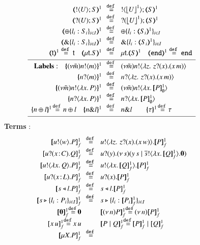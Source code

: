 \begin{figure}[t]
\[\begin{array}{rcll}
	\tmap{\btout{U} S}{1} &\!\!\defeq\!\!& \btout{{\vtmap{U}{1}}} \tmap{S}{1}\\
	\tmap{\btinp{U} S}{1} &\!\!\defeq\!\!& \btinp{{\vtmap{U}{1}}} \tmap{S}{1}\\
	\tmap{\btsel{l_i: S_i}_{i \in I}}{1} &\!\!\defeq\!\!& \btsel{l_i: \tmap{S_i}{1}}_{i \in I}\\
			\tmap{\btbra{l_i: S_i}_{i \in I}}{1} &\!\!\defeq\!\!& \btbra{l_i: \tmap{S_i}{1}}_{i \in I}\\
	\tmap{\vart{t}}{1} \defeq \vart{t} \quad 
			\tmap{\trec{t}{S}}{1}  &\!\!\defeq\!\!&
	\trec{t}{\tmap{S}{1}}\quad 
	\tmap{\tinact}{1}  \defeq  \tinact\\[1mm]
	\hline
	\noindent{\bf Labels:} \quad 
		\mapa{(\nu \tilde{m})\bactout{n}{m}}^{1} &\!\!\defeq\!\!&   
(\nu \tilde{m})\bactout{n}{\abs{z}{\,\binp{z}{x} (\appl{x}{m})} } \\
		\mapa{\bactinp{n}{m}}^{1} &\!\!\defeq\!\!&   \bactinp{n}{\abs{z}{\,\binp{z}{x} (\appl{x}{m})} } \\
	\mapa{(\nu \tilde{m})\bactout{n}{\abs{{x}}{P}}}^{1} &\!\!\defeq\!\!& 
(\nu \tilde{m})\bactout{n}{\abs{{x}}{\pmapp{P}{1}{\es}}}\\
			\mapa{\bactinp{n}{\abs{{x}}{P}}}^{1} &\!\!\defeq\!\!& \bactinp{n}{\abs{{x}}{\pmapp{P}{1}{\es}}}\\
			\mapa{\bactsel{n}{l} }^{1} \!\defeq\! \bactsel{n}{l} 
	\quad 
			\mapa{\bactbra{n}{l} }^{1} &\!\!\defeq\!\!& \bactbra{n}{l} 
	\quad \quad 
			\mapa{\tau}^{1} \!\defeq\! \tau
\\[1mm]
\hline
\end{array}
\]
{\bf Terms} : 
\[
\begin{array}{rcll}
  \pmapp{\bout{u}{w} P}{1}{f}	&\!\!\defeq\!\!&	\bout{u}{ \abs{z}{\,\binp{z}{x} (\appl{x}{w})} } \pmapp{P}{1}{f} \\
  \pmapp{\binp{u}{\AT{x}{C}} Q}{1}{f}	&\!\!\defeq\!\!&	\binp{u}{y} \newsp{s}{\appl{y}{s} \Par \bout{\dual{s}}{\abs{x}{\pmapp{Q}{1}{f}}} \inact} \\
		\pmapp{\bout{u}{\abs{{x}}{Q}} P}{1}{f}  
&\!\!\defeq\!\!& \bout{u}{\abs{{x}}{\pmapp{Q}{1}{f}}} \pmapp{P}{1}{f} \\
		\pmapp{\binp{u}{\AT{x}{L}} P}{1}{f} &\!\!\defeq\!\!& \binp{u}{x} \pmapp{P}{1}{f}\\
		\pmapp{\bsel{s}{l} P}{1}{f} &\!\!\defeq\!\!& \bsel{s}{l} \pmapp{P}{1}{f}\\
		\pmapp{\bbra{s}{l_i: P_i}_{i \in I}}{1}{f} &\!\!\defeq\!\!& \bbra{s}{l_i: \pmapp{P_i}{1}{f}}_{i \in I}\\
		\pmapp{\inact}{1}{f} \!\!\defeq\!\!\inact
& & 
		\pmapp{\news{n} P}{1}{f} \!\!\defeq\!\! \news{n} \pmapp{P}{1}{f}\\
\pmapp{{x}\, {u}}{1}{f}
 \!\!\defeq\!\!
{x}\, {u}
& & 		\pmapp{P \Par Q}{1}{f} \!\!\defeq\!\! \pmapp{P}{1}{f} \Par \pmapp{Q}{1}{f} \\
		\pmapp{\recp{X}{P}}{1}{f} &\!\!\defeq\!\!&\!\!\!\!\!\!
	

\end{array}\]
\end{figure}

